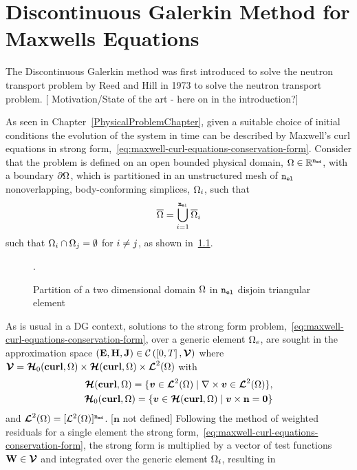 \chapter{Discontinuous Galerkin Method for Maxwells Equations} %
\label{Chapter3}

The Discontinuous Galerkin method was first introduced to solve the neutron transport problem by Reed and Hill \cite{reed1973triangularmesh} in 1973 to solve the neutron transport problem. [ Motivation/State of the art - here on in the introduction?]

As seen in Chapter~\ref{PhysicalProblemChapter}, given a suitable choice of
initial conditions the evolution of the system in time can be described by
Maxwell's curl equations in strong
form,~\eqref{eq:maxwell-curl-equations-conservation-form}. Consider that the problem is defined on an open bounded physical domain, $\Omega \in \mathbb{R}^{\texttt{n}_{\texttt{sd}}}$, with a boundary $\partial \Omega$,
which is partitioned in an unstructured mesh of $\texttt{n}_{\texttt{el}}$ nonoverlapping, body-conforming simplices, $\Omega_i$, such that
$$
\overline{\Omega} = \mathop{\bigcup}_{i=1}^{\texttt{n}_{\texttt{el}}} \overline{\Omega}_i
$$
such that $\Omega_i \cap \Omega_j = \emptyset $ for $i \neq j$, as shown in~\ref{fig:meshPartitionFigure}.
\begin{figure}
  \centering
  
  \caption{Partition of a two dimensional domain $\Omega$ in $\texttt{n}_{\texttt{el}}$ disjoin triangular element}
  \label{fig:meshPartitionFigure}.
\end{figure}

As is usual in a DG context, solutions to the strong form problem,~\eqref{eq:maxwell-curl-equations-conservation-form}, over a generic
element $\Omega_e$, are sought in the approximation space $\left(
  \mathbf{E},\mathbf{H},\mathbf{J} \right) \in \mathcal{C} \left( \left[ 0,
    T \right], \boldsymbol{\mathcal{V}} \right)$ where
$ \boldsymbol{\mathcal{V}} = \boldsymbol{\mathcal{H}}_0(\textbf{curl},\Omega) \times \boldsymbol{\mathcal{H}}(\textbf{curl},\Omega) \times \boldsymbol{\mathcal{L}}^2(\Omega) $
with
\begin{align*}
\boldsymbol{\mathcal{H}}(\textbf{curl},\Omega) = \{ \boldsymbol{v} \in \boldsymbol{\mathcal{L}}^2(\Omega)  \; | \; \nabla \times \boldsymbol{v} \in \boldsymbol{\mathcal{L}}^2(\Omega) \},  \\
\boldsymbol{\mathcal{H}}_0(\textbf{curl},\Omega) = \{ \boldsymbol{v} \in \boldsymbol{\mathcal{H}}(\textbf{curl},\Omega)  \; | \; \boldsymbol{v} \times \mathbf{n}  = \boldsymbol{0}  \} 
\end{align*}
and $\boldsymbol{\mathcal{L}}^2(\Omega) = [ \mathcal{L}^2(\Omega) ]^{\texttt{n}_{\texttt{sd}}}$. [$\mathbf{n}$ not defined]
Following the method of weighted residuals for a single element the strong form,~\eqref{eq:maxwell-curl-equations-conservation-form}, the strong form 
is multiplied by a vector of test functions $\mathbf{W} \in \boldsymbol{\mathcal{V}}
$ and integrated over the generic element $\Omega_i$, resulting in

